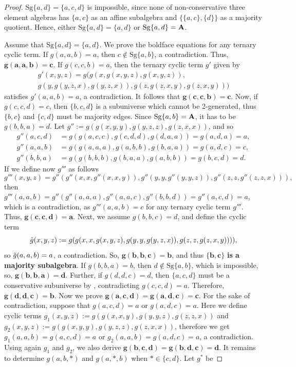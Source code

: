 \documentclass[11pt]{amsart}
\newcommand{\m}[1]{\mathbf{\uppercase{#1}}}
\theoremstyle{definition}
\theoremstyle{remark}
\theoremstyle{plain}
\begin{document}
\begin{proof}
$\mathrm{Sg}\{a,d\}=\{a,c,d\}$ is impossible, since none of non-conservative three element algebras has $\{a,c\}$ as an affine subalgebra and $\{\{a,c\},\{d\}\}$ as a majority quotient. Hence, either $\mathrm{Sg}\{a,d\}=\{a,d\}$ or $\mathrm{Sg}\{a,d\}=\m a$. 

Assume that $\mathrm{Sg}\{a,d\}=\{a,d\}$. We prove the boldface equations for any ternary cyclic term. If $g(a,a,b)=a$, then $c\notin \mathrm{Sg}\{a,b\}$, a contradiction. Thus, $\mathbf{g(a,a,b)=c}$. If $g(c,c,b)=a$, then the ternary cyclic term $g'$ given by 
$$
\begin{gathered}
g'(x,y,z)=g(g(x,g(x,y,z),g(x,y,z)),\\
g(y,g(y,z,x),g(y,z,x)),g(z,g(z,x,y),g(z,x,y)))
\end{gathered}
$$ 
satisfies $g'(a,a,b)=a$, a contradiction. It follows that $\mathbf{g(c,c,b)=c}$. 
Now, if $g(c,c,d)=c$, then $\{b,c,d\}$ is a subuniverse which cannot be 2-generated, thus $\{b,c\}$ and $\{c,d\}$ must be majority edges. Since $\mathrm{Sg}\{a,b\}=\m a$, it has to be $g(b,b,a)=d$. Let $g'':=g(g(x,y,y),g(y,z,z),g(z,x,x))$, and so
 \begin{align*}
     g''(a,c,d)&=g(g(a,c,c),g(c,d,d),g(d,a,a))=g(a,d,a)=a,\\
     g''(a,a,b)&=g(g(a,a,a),g(a,b,b),g(b,a,a))=g(a,d,c)=c,\\
     g''(b,b,a)&=g(g(b,b,b),g(b,a,a),g(a,b,b))=g(b,c,d)=d.
 \end{align*}
If we define now $g'''$ as follows $$g'''(x,y,z)=g''(g''(x,x,g''(x,x,y)),g''(y,y,g''(y,y,z)),g''(z,z,g''(z,z,x))),$$
then $g'''(a,a,b)=g''(g''(a,a,a),g''(a,a,c),g''(b,b,d))=g''(a,c,d)=a$, which is a contradiction, as $g'''(a,a,b)=c$ for any ternary cyclic term $g'''$. Thus, $\mathbf{g(c,c,d) =a}$. Next, we assume $g(b,b,c)=d$, and define the cyclic term $$\Tilde{g}(x,y,z):=g(g(x,x,g(x,y,z),g(y,y,g(y,z,x)),g(z,z,g(z,x,y)))),$$ so $\Tilde{g}(a,a,b)=a$, a contradiction. So, $\mathbf{g(b,b,c)=b}$, and thus $\mathbf{\{b,c\}}$ {\bf is a majority subalgebra}. If $g(b,b,a)=b$, then $d\notin\mathrm{Sg}\{a,b\}$, which is impossible, so, $\mathbf{g(b,b,a)=d}$. Further, if $g(d,d,c)=d$, then $\{a,c,d\}$ must be a conservative subuniverse by , contradicting $g(c,c,d)=a$. Therefore, $\mathbf{g(d,d,c)=b}$. Now we prove $\mathbf{g(a,c,d)=g(a,d,c)=c}$. For the sake of contradiction, suppose that $g(a,c,d)=a$ or $g(a,d,c)=a$. Here we define cyclic terms $g_1(x,y,z):=g(g(x,x,y),g(y,y,z),g(z,z,x))$ and $g_2(x,y,z):=g(g(x,y,y),g(y,z,z),g(z,x,x))$, therefore we get $g_1(a,a,b)=g(a,c,d)=a$ or $g_2(a,a,b)=g(a,d,c)=a$, a contradiction. Using again $g_1$ and $g_2$, we also derive $\mathbf{g(b,c,d)=g(b,d,c)=d}$. It remains to determine $g(a,b,\ast)$ and $g(a,\ast,b)$ when $\ast\in\{c,d\}$. Let $g^*$ be 

\end{proof}
\end{document}
